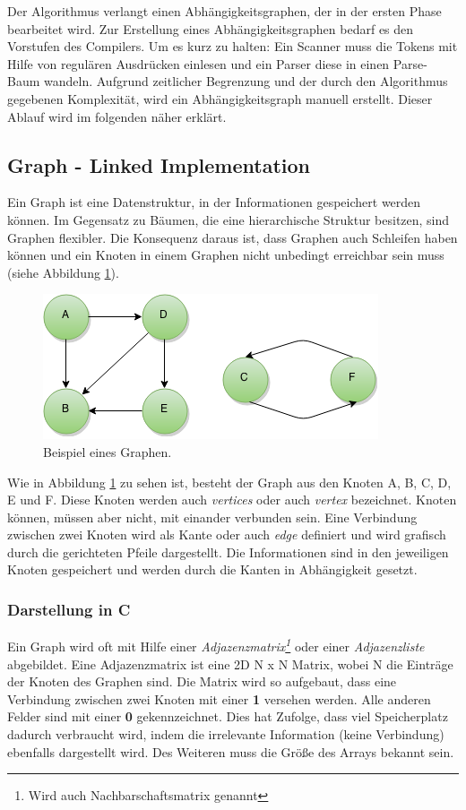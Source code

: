 Der Algorithmus verlangt einen Abhängigkeitsgraphen, der in der ersten Phase bearbeitet wird. Zur Erstellung eines Abhängigkeitsgraphen bedarf es den Vorstufen des Compilers. Um es kurz zu halten: Ein Scanner muss die Tokens mit Hilfe von regulären Ausdrücken einlesen und ein Parser diese in einen Parse-Baum wandeln. Aufgrund zeitlicher Begrenzung und der durch den Algorithmus gegebenen Komplexität, wird ein Abhängigkeitsgraph manuell erstellt. Dieser Ablauf wird im folgenden näher erklärt.

\subsection{Graph - Linked Implementation}\label{kap:graph} 
Ein Graph ist eine Datenstruktur, in der Informationen gespeichert werden können. Im Gegensatz zu Bäumen, die eine hierarchische Struktur besitzen, sind Graphen flexibler. Die Konsequenz daraus ist, dass Graphen auch Schleifen haben können und ein Knoten in einem Graphen nicht unbedingt erreichbar sein muss (siehe Abbildung \ref{fig:Graph}).
\begin{figure}[h]
	\centering
	\includegraphics[scale=0.5]{images/Graph.png} 
	\caption{Beispiel eines Graphen.}
	\label{fig:Graph}
\end{figure}
Wie in Abbildung \ref{fig:Graph} zu sehen ist, besteht der Graph aus den Knoten A, B, C, D, E und F. Diese Knoten werden auch \textit{vertices} oder auch \textit{vertex} bezeichnet. Knoten können, müssen aber nicht, mit einander verbunden sein. Eine Verbindung zwischen zwei Knoten wird als Kante oder auch \textit{edge} definiert und wird grafisch durch die gerichteten Pfeile dargestellt. Die Informationen sind in den jeweiligen Knoten gespeichert und werden durch die Kanten in Abhängigkeit gesetzt. 

\subsubsection*{Darstellung in C}
Ein Graph wird oft mit Hilfe einer \textit{Adjazenzmatrix\footnote{Wird auch Nachbarschaftsmatrix genannt}} oder einer \textit{Adjazenzliste} abgebildet. Eine Adjazenzmatrix ist eine 2D N x N Matrix, wobei N die Einträge der Knoten des Graphen sind. Die Matrix wird so aufgebaut, dass eine Verbindung zwischen zwei Knoten mit einer \textbf{1} versehen werden. Alle anderen Felder sind mit einer \textbf{0} gekennzeichnet. Dies hat Zufolge, dass viel Speicherplatz dadurch verbraucht wird, indem die irrelevante Information (keine Verbindung) ebenfalls dargestellt wird. Des Weiteren muss die Größe des Arrays bekannt sein. 

